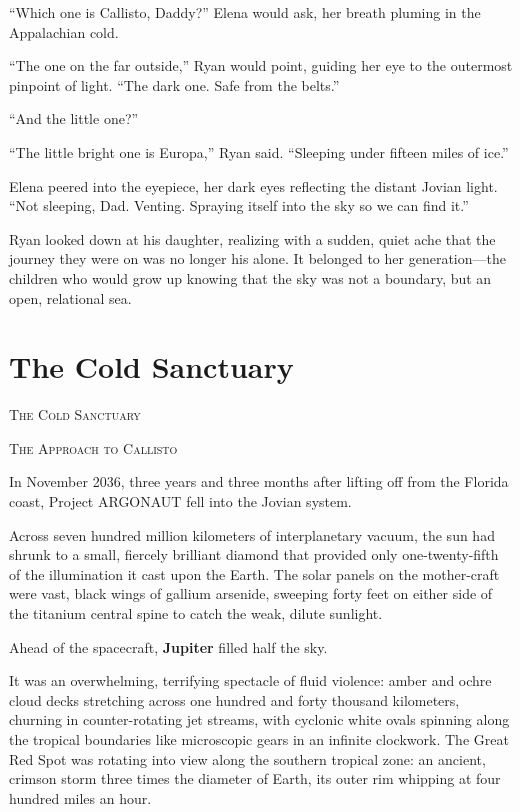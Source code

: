 \documentclass[12pt,twoside,openright]{book}
\newcommand{\sceneheader}[1]{%
  \par\vspace{1.8em}%
  {\noindent\centering\scshape\large #1\par}%
  \vspace{1.0em}%
  \noindent%
}
\begin{document}
``Which one is Callisto, Daddy?'' Elena would ask, her breath pluming in
the Appalachian cold.

``The one on the far outside,'' Ryan would point, guiding her eye to the
outermost pinpoint of light. ``The dark one. Safe from the belts.''

``And the little one?''

``The little bright one is Europa,'' Ryan said. ``Sleeping under fifteen
miles of ice.''

Elena peered into the eyepiece, her dark eyes reflecting the distant
Jovian light. ``Not sleeping, Dad. Venting. Spraying itself into the sky
so we can find it.''

Ryan looked down at his daughter, realizing with a sudden, quiet ache
that the journey they were on was no longer his alone. It belonged to
her generation---the children who would grow up knowing that the sky was
not a boundary, but an open, relational sea.

\chapter{The Cold Sanctuary}
\sceneheader{The Cold Sanctuary}

\sceneheader{The Approach to Callisto}

In November 2036, three years and three months after lifting off from
the Florida coast, Project ARGONAUT fell into the Jovian system.

Across seven hundred million kilometers of interplanetary vacuum, the
sun had shrunk to a small, fiercely brilliant diamond that provided only
one-twenty-fifth of the illumination it cast upon the Earth. The solar
panels on the mother-craft were vast, black wings of gallium arsenide,
sweeping forty feet on either side of the titanium central spine to
catch the weak, dilute sunlight.

Ahead of the spacecraft, \textbf{Jupiter} filled half the sky.

It was an overwhelming, terrifying spectacle of fluid violence: amber
and ochre cloud decks stretching across one hundred and forty thousand
kilometers, churning in counter-rotating jet streams, with cyclonic
white ovals spinning along the tropical boundaries like microscopic
gears in an infinite clockwork. The Great Red Spot was rotating into
view along the southern tropical zone: an ancient, crimson storm three
times the diameter of Earth, its outer rim whipping at four hundred
miles an hour.
\end{document}
